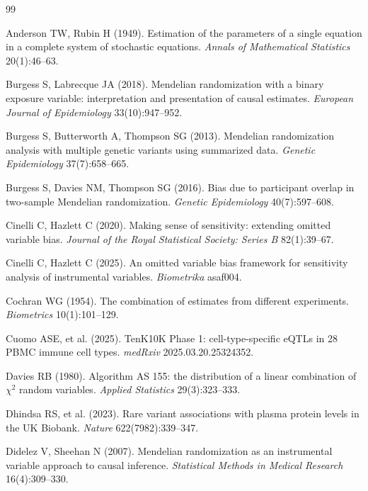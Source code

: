 \documentclass[11pt]{article}
\begin{document}
\begin{thebibliography}{99}

Anderson TW, Rubin H (1949). Estimation of the parameters of a single equation in a complete system of stochastic equations. \emph{Annals of Mathematical Statistics} 20(1):46--63.

Burgess S, Labrecque JA (2018). Mendelian randomization with a binary exposure variable: interpretation and presentation of causal estimates. \emph{European Journal of Epidemiology} 33(10):947--952.

Burgess S, Butterworth A, Thompson SG (2013). Mendelian randomization analysis with multiple genetic variants using summarized data. \emph{Genetic Epidemiology} 37(7):658--665.

Burgess S, Davies NM, Thompson SG (2016). Bias due to participant overlap in two-sample Mendelian randomization. \emph{Genetic Epidemiology} 40(7):597--608.

Cinelli C, Hazlett C (2020). Making sense of sensitivity: extending omitted variable bias. \emph{Journal of the Royal Statistical Society: Series B} 82(1):39--67.

Cinelli C, Hazlett C (2025). An omitted variable bias framework for sensitivity analysis of instrumental variables. \emph{Biometrika} asaf004.

Cochran WG (1954). The combination of estimates from different experiments. \emph{Biometrics} 10(1):101--129.

Cuomo ASE, et al. (2025). TenK10K Phase 1: cell-type-specific eQTLs in 28 PBMC immune cell types. \emph{medRxiv} 2025.03.20.25324352.

Davies RB (1980). Algorithm AS 155: the distribution of a linear combination of $\chi^2$ random variables. \emph{Applied Statistics} 29(3):323--333.

Dhindsa RS, et al. (2023). Rare variant associations with plasma protein levels in the UK Biobank. \emph{Nature} 622(7982):339--347.

Didelez V, Sheehan N (2007). Mendelian randomization as an instrumental variable approach to causal inference. \emph{Statistical Methods in Medical Research} 16(4):309--330.


\end{thebibliography}
\end{document}
